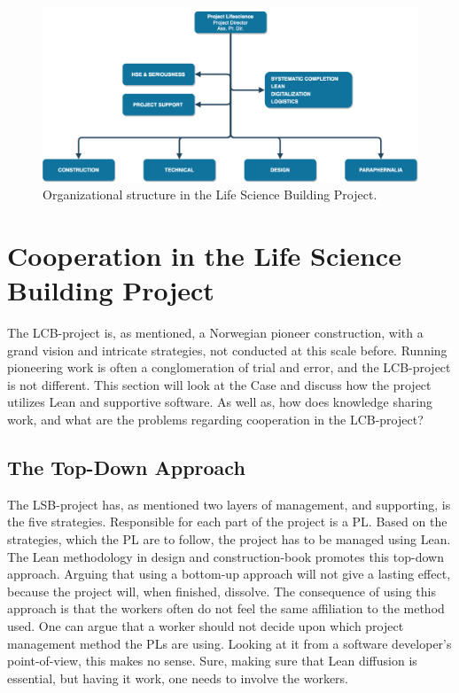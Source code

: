 \begin{figure}
    \centering
    \includegraphics[width=\textwidth]{fig/lvb_diagram.png}
    \caption{Organizational structure in the Life Science Building Project.}
    \label{fig:project_structure}
\end{figure}

\section{Cooperation in the Life Science Building Project}
The LCB-project is, as mentioned, a Norwegian pioneer construction, with a grand vision and intricate strategies, not conducted at this scale before. Running pioneering work is often a conglomeration of trial and error, and the LCB-project is not different. This section will look at the Case and discuss how the project utilizes Lean and supportive software. As well as, how does knowledge sharing work, and what are the problems regarding cooperation in the LCB-project? 

\subsection{The Top-Down Approach}
The LSB-project has, as mentioned two layers of management, and supporting, is the five strategies. Responsible for each part of the project is a PL. Based on the strategies, which the PL are to follow, the project has to be managed using Lean. The Lean methodology in design and construction-book promotes this top-down approach. Arguing that using a bottom-up approach will not give a lasting effect, because the project will, when finished, dissolve. The consequence of using this approach is that the workers often do not feel the same affiliation to the method used. One can argue that a worker should not decide upon which project management method the PLs are using. Looking at it from a software developer's point-of-view, this makes no sense. Sure, making sure that Lean diffusion is essential, but having it work, one needs to involve the workers. 

